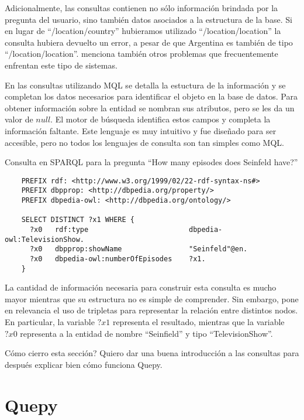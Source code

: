 Adicionalmente, las consultas contienen no sólo información brindada por la pregunta del usuario, sino también datos asociados a la estructura de la base. Si en lugar de ``/location/country'' hubieramos utilizado ``/location/location'' la consulta hubiera devuelto un error, a pesar de que Argentina es también de tipo ``/location/location''. \citet{ungerQALD} menciona también otros problemas que frecuentemente enfrentan este tipo de sistemas.

En las consultas utilizando MQL se detalla la estuctura de la información y se completan los datos necesarios para identificar el objeto en la base de datos. Para obtener información sobre la entidad se nombran sus atributos, pero se les da un valor de $null$. El motor de búsqueda identifica estos campos y completa la información faltante. Este lenguaje es muy intuitivo y fue diseñado para ser accesible, pero no todos los lenguajes de consulta son tan simples como MQL.

\vspace{5mm}
\begin{example} Consulta en SPARQL para la pregunta ``How many episodes does Seinfeld have?''
    \begin{lstlisting}
    PREFIX rdf: <http://www.w3.org/1999/02/22-rdf-syntax-ns#>
    PREFIX dbpprop: <http://dbpedia.org/property/>
    PREFIX dbpedia-owl: <http://dbpedia.org/ontology/>

    SELECT DISTINCT ?x1 WHERE {
      ?x0   rdf:type                        dbpedia-owl:TelevisionShow.
      ?x0   dbpprop:showName                "Seinfeld"@en.
      ?x0   dbpedia-owl:numberOfEpisodes    ?x1.
    }
    \end{lstlisting}
\end{example}

La cantidad de información necesaria para construir esta consulta es mucho mayor mientras que su estructura no es simple de comprender. Sin embargo, pone en relevancia el uso de tripletas para representar la relación entre distintos nodos. En particular, la variable $?x1$ representa el resultado, mientras que la variable $?x0$ representa a la entidad de nombre ``Seinfield'' y tipo ``TelevisionShow''.

Cómo cierro esta sección? Quiero dar una buena introducción a las consultas para después explicar bien cómo funciona Quepy.


\section{Quepy}

